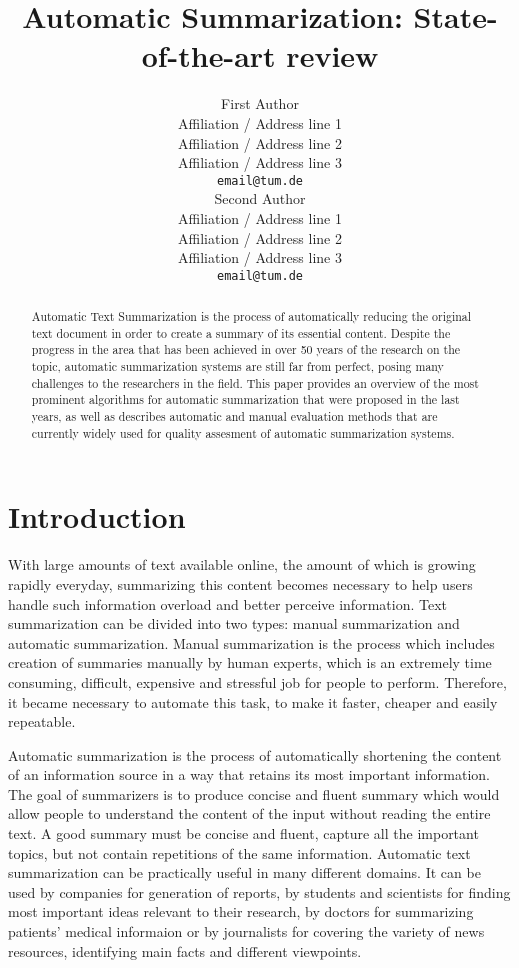 \documentclass[11pt,a4paper,onecolumn]{article}
\title{Automatic Summarization: State-of-the-art review}
\author{First Author \\
  Affiliation / Address line 1 \\
  Affiliation / Address line 2 \\
  Affiliation / Address line 3 \\
  {\tt email@tum.de} \\\And
  Second Author \\
  Affiliation / Address line 1 \\
  Affiliation / Address line 2 \\
  Affiliation / Address line 3 \\
  {\tt email@tum.de} \\}
\date{}
\begin{document}
\maketitle
\begin{abstract}
Automatic Text Summarization is the process of automatically reducing the original text document in order to create a summary of its essential content.
Despite the progress in the area that has been achieved in over 50 years of the research on the topic, automatic summarization systems are still far from perfect, posing many challenges to the researchers in the field.
This paper provides an overview of the most prominent algorithms for automatic summarization that were proposed in the last years, as well as describes automatic and manual evaluation methods that are currently widely used for quality assesment of automatic summarization systems.
\end{abstract}


\section{Introduction}
With large amounts of text available online, the amount of which is growing rapidly everyday, summarizing this content becomes necessary to help users handle such information overload and better perceive information.
Text summarization can be divided into two types: manual summarization and automatic summarization.
Manual summarization is the process which includes creation of summaries manually by human experts, which is an extremely time consuming, difficult, expensive and stressful job for people to perform.
Therefore, it became necessary to automate this task, to make it faster, cheaper and easily repeatable.

Automatic summarization is the process of automatically shortening the content of an information source in a way that retains its most important information.
The goal of summarizers is to produce concise and fluent summary which would allow people to understand the content of the input without reading the entire text.
A good summary must be concise and fluent, capture all the important topics, but not contain repetitions of the same information.
Automatic text summarization can be practically useful in many different domains.
It can be used by companies for generation of reports, by students and scientists for finding most important ideas relevant to their research, by doctors for summarizing patients' medical informaion or by journalists for covering the variety of news resources, identifying main facts and different viewpoints.
\end{document}
